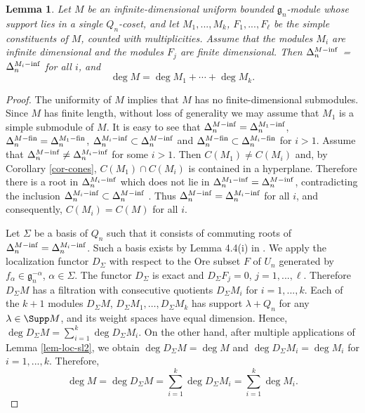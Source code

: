 \documentclass[12pt]{amsart}
\def\gg{\mathfrak{g}}
\newtheorem{lem}[thm]{Lemma}
\begin{document}
\begin{lem} \label{lem-deg}
Let  $M$ be an infinite-dimensional uniform bounded $\gg_n$-module whose support lies in a single $Q_n$-coset, and let $M_1,...,M_k$, $F_1,...,F_{\ell}$ be the simple constituents of $M$, counted with multiplicities. Assume that the modules $M_i$ are infinite dimensional and the modules $F_j$ are finite dimensional. Then $\Delta_n^{M-{\rm inf}}$ = $\Delta_n^{M_i-{\rm inf}}$ for all $i$, and 
$$
\deg M = \deg M_1 + \cdots + \deg M_k .
$$
\end{lem}
\begin{proof} The uniformity of $M$ implies that $M$ has no finite-dimensional submodules. Since $M$ has finite length, without loss of generality we may assume that $M_1$ is a simple submodule of $M$. It is easy to see that $\Delta_n^{M{\rm-inf}} =\Delta_n^{M_1{\rm-inf}}$, $\Delta_n^{M{\rm-fin}} =\Delta_n^{M_1{\rm-fin}}$, $\Delta_n^{M_i{\rm-inf}} \subset \Delta_n^{M{\rm-inf}}$ and $\Delta_n^{M{\rm-fin}} \subset \Delta_n^{M_i{\rm-fin}}$ for $i>1$. Assume that $\Delta_n^{M{\rm-inf}} \neq\Delta_n^{M_i{\rm-inf}}$ for some $i>1$. Then $C(M_1) \neq C(M_i)$ and, by Corollary \ref{cor-cones}, $C(M_1) \cap C(M_i)$ is contained in a hyperplane. Therefore there is a root in $\Delta_n^{M_i{\rm-inf}} $ which does not lie in $\Delta_n^{M_1{\rm-inf}} = \Delta_n^{M{\rm-inf}}$, contradicting the inclusion  $\Delta_n^{M_i{\rm-inf}} \subset \Delta_n^{M{\rm-inf}}$ . Thus $\Delta_n^{M{\rm-inf}} = \Delta_n^{M_i{\rm-inf}}$ for all $i$, and consequently, $C(M_i)=C(M)$ for all $i$.

Let $\Sigma$ be a basis of $Q_n$ such that it consists of commuting roots of  $\Delta_n^{M{\rm-inf}} =  \Delta_n^{M_i{\rm-inf}}$. Such a basis exists by Lemma 4.4(i) in \cite{M}. We apply the localization functor ${D}_{\Sigma}$ with respect to the Ore subset $F$ of $U_n$ generated by $f_{\alpha} \in \gg_n^{-\alpha}$, $\alpha \in \Sigma$.  The functor ${D}_{\Sigma}$ is  exact  and  $D_{\Sigma} F_j = 0$, $j=1,...,\ell$. Therefore $D_{\Sigma}M$ has a filtration with consecutive quotients $D_{\Sigma}M_i$ for $i=1,...,k$. Each of the $k+1$ modules $D_{\Sigma}M$, $D_{\Sigma}M_1,\dots, D_{\Sigma}M_k$ has support $\lambda + Q_n$ for any $\lambda \in \Supp M$,  and its weight spaces have equal dimension. Hence,  $\deg D_{\Sigma} M = \sum_{i=1}^k \deg D_{\Sigma} M_i$. On the other hand, after multiple applications of Lemma \ref{lem-loc-sl2}, we obtain $\deg D_{\Sigma}M = \deg M $ and $\deg D_{\Sigma}M_i = \deg M_i$ for $i=1,...,k$. Therefore, 
$$
\deg M = \deg D_{\Sigma} M = \sum_{i=1}^k \deg D_{\Sigma} M_i =   \sum_{i=1}^k \deg  M_i.
$$
\end{proof}
\end{document}
